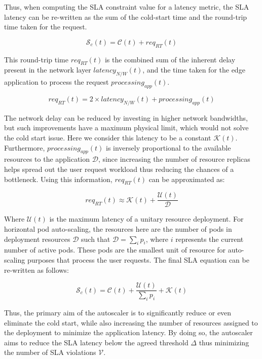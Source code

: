 Thus, when computing the SLA constraint value for a latency metric, the SLA latency can be re-written as the sum of the cold-start time and the round-trip time taken for the request.

\begin{equation}
    \mathcal{S}_{c}(t) = \mathcal{C}(t) + req_{RT}(t)
\end{equation}


This round-trip time $req_{RT}(t)$ is the combined sum of the inherent delay present in the network layer $latency_{N/W}(t)$, and the time taken for the edge application to process the request $processing_{app}(t)$.

\begin{equation}
    req_{RT}(t) = 2 \times latency_{N/W}(t) + processing_{app}(t)
\end{equation}

The network delay can be reduced by investing in higher network bandwidths, but such improvements have a maximum physical limit, which would not solve the cold start issue. Here we consider this latency to be a constant $\mathcal{K}(t)$. Furthermore, $processing_{app}(t)$ is inversely proportional to the available resources to the application $\mathcal{D}$, since increasing the number of resource replicas helps spread out the user request workload thus reducing the chances of a bottleneck. Using this information, $req_{RT}(t)$ can be approximated as:

\begin{equation}
    req_{RT}(t) \approx \mathcal{K}(t) + \frac{\mathcal{U}(t)}{\mathcal{D}}
\end{equation}

Where $\mathcal{U}(t)$ is the maximum latency of a unitary resource deployment. For horizontal pod auto-scaling, the resources here are the number of pods in deployment resources $\mathcal{D}$ such that $\mathcal{D} = \sum_{i} p_{i}$, where $i$ represents the current number of active pods. These pods are the smallest unit of resource for auto-scaling purposes that process the user requests. The final SLA equation can be re-written as follows:

\begin{equation}
    \mathcal{S}_{c}(t) = \mathcal{C}(t) + \frac{\mathcal{U}(t)}{\sum_{i} p_{i}} + \mathcal{K}(t)
    \label{eqn:sla-cold-start}
\end{equation}

Thus, the primary aim of the autoscaler is to significantly reduce or even eliminate the cold start, while also increasing the number of resources assigned to the deployment to minimize the application latency. By doing so, the autoscaler aims to reduce the SLA latency below the agreed threshold $\Delta$ thus minimizing the number of SLA violations $\mathcal{V}$.\par

